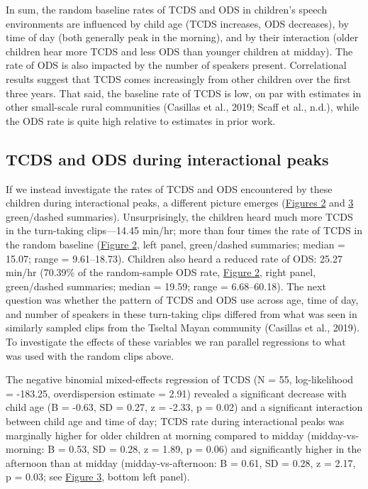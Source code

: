 \documentclass[
  english,
  ,man,floatsintext]{apa6}
\begin{document}
In sum, the random baseline rates of TCDS and ODS in children's speech environments are influenced by child age (TCDS increases, ODS decreases), by time of day (both generally peak in the morning), and by their interaction (older children hear more TCDS and less ODS than younger children at midday). The rate of ODS is also impacted by the number of speakers present. Correlational results suggest that TCDS comes increasingly from other children over the first three years. That said, the baseline rate of TCDS is low, on par with estimates in other small-scale rural communities (Casillas et al., 2019; Scaff et al., n.d.), while the ODS rate is quite high relative to estimates in prior work.

\hypertarget{tcds-and-ods-during-interactional-peaks}{%
\subsection{TCDS and ODS during interactional peaks}\label{tcds-and-ods-during-interactional-peaks}}

If we instead investigate the rates of TCDS and ODS encountered by these children during interactional peaks, a different picture emerges (\protect\hyperlink{fig2}{Figures 2} and \protect\hyperlink{fig3}{3} green/dashed summaries). Unsurprisingly, the children heard much more TCDS in the turn-taking clips---14.45 min/hr; more than four times the rate of TCDS in the random baseline (\protect\hyperlink{fig2}{Figure 2}, left panel, green/dashed summaries; median = 15.07; range = 9.61--18.73). Children also heard a reduced rate of ODS: 25.27 min/hr (70.39\% of the random-sample ODS rate, \protect\hyperlink{fig2}{Figure 2}, right panel, green/dashed summaries; median = 19.59; range = 6.68--60.18). The next question was whether the pattern of TCDS and ODS use across age, time of day, and number of speakers in these turn-taking clips differed from what was seen in similarly sampled clips from the Tseltal Mayan community (Casillas et al., 2019). To investigate the effects of these variables we ran parallel regressions to what was used with the random clips above.

The negative binomial mixed-effects regression of TCDS (N = 55, log-likelihood = -183.25, overdispersion estimate = 2.91) revealed a significant decrease with child age (B = -0.63, SD = 0.27, z = -2.33, p = 0.02) and a significant interaction between child age and time of day; TCDS rate during interactional peaks was marginally higher for older children at morning compared to midday (midday-vs-morning: B = 0.53, SD = 0.28, z = 1.89, p = 0.06) and significantly higher in the afternoon than at midday (midday-vs-afternoon: B = 0.61, SD = 0.28, z = 2.17, p = 0.03; see \protect\hyperlink{fig3}{Figure 3}, bottom left panel).
\end{document}
